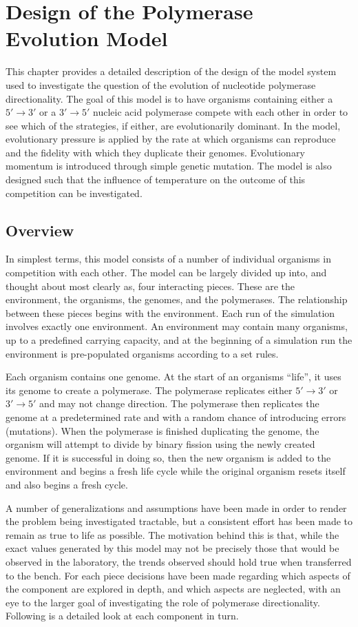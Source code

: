 \chapter{Design of the Polymerase Evolution Model} %
\label{cha:design_of_the_polymerase_evolution_model}
This chapter provides a detailed description of the design of the model system used to investigate the question of the evolution of nucleotide polymerase directionality. The goal of this model is to have organisms containing either a $5'\to3'$ or a $3'\to5'$ nucleic acid polymerase compete with each other in order to see which of the strategies, if either, are evolutionarily dominant. In the model, evolutionary pressure is applied by the rate at which organisms can reproduce and the fidelity with which they duplicate their genomes. Evolutionary momentum is introduced through simple genetic mutation. The model is also designed such that the influence of temperature on the outcome of this competition can be investigated.

\section*{Overview} %
\label{sec:overview}
In simplest terms, this model consists of a number of individual organisms in competition with each other. The model can be largely divided up into, and thought about most clearly as, four interacting pieces. These are the environment, the organisms, the genomes, and the polymerases. The relationship between these pieces begins with the environment. Each run of the simulation involves exactly one environment. An environment may contain many organisms, up to a predefined carrying capacity, and at the beginning of a simulation run the environment is pre-populated organisms according to a set rules.

Each organism contains one genome. At the start of an organisms ``life'', it uses its genome to create a polymerase. The polymerase replicates either $5'\to3'$ or $3'\to5'$ and may not change direction. The polymerase then replicates the genome at a predetermined rate and with a random chance of introducing errors (mutations). When the polymerase is finished duplicating the genome, the organism will attempt to divide by binary fission using the newly created genome. If it is successful in doing so, then the new organism is added to the environment and begins a fresh life cycle while the original organism resets itself and also begins a fresh cycle.

A number of generalizations and assumptions have been made in order to render the problem being investigated tractable, but a consistent effort has been made to remain as true to life as possible. The motivation behind this is that, while the exact values generated by this model may not be precisely those that would be observed in the laboratory, the trends observed should hold true when transferred to the bench. For each piece decisions have been made regarding which aspects of the component are explored in depth, and which aspects are neglected, with an eye to the larger goal of investigating the role of polymerase directionality. Following is a detailed look at each component in turn.

